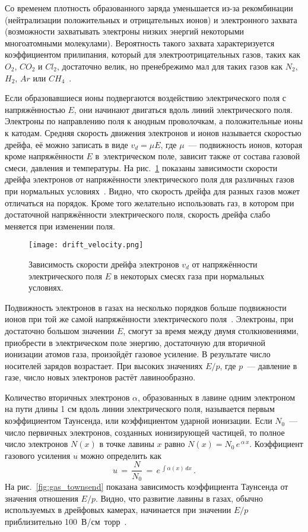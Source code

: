 Со временем плотность образованного заряда уменьшается из-за рекомбинации
(нейтрализации положительных и отрицательных ионов) и электронного захвата
(возможности захватывать электроны низких энергий некоторыми многоатомными
молекулами). Вероятность такого захвата характеризуется коэффициентом
прилипания, который для электроотрицательных газов, таких как $O_2$, $CO_2$ и
$Cl_2$, достаточно велик, но пренебрежимо мал для таких газов как $N_2$, $H_2$,
$Ar$ или $CH_4$~\cite{klajk90}.

Если образовавшиеся ионы подвергаются воздействию электрического поля с
напряжённостью $E$, они начинают двигаться вдоль линий электрического
поля. Электроны по направлению поля к анодным проволочкам, а положительные ионы
к катодам. Средняя скорость движения электронов и ионов называется скоростью
дрейфа, её можно записать в виде $v_d = \mu E$, где $\mu$~--- подвижность
ионов, которая кроме напряжённости $E$ в~электрическом поле, зависит также от
состава газовой смеси, давления и температуры. На рис.~\ref{fig:drift_velocity}
показаны зависимости скорости дрейфа электронов от напряжённости электрического
поля для различных газов при нормальных условиях~\cite{sauli02}. Видно, что
скорость дрейфа для разных газов может отличаться на порядок. Кроме того
желательно использовать газ, в котором при достаточной напряжённости
электрического поля, скорость дрейфа слабо меняется при изменении поля.

\vspace{-0.5cm}
\begin{figure}[h]
  \centering
  \texttt{[image: drift\_velocity.png]}
  \caption{Зависимость скорости дрейфа электронов $v_d$ от напряжённости
    электрического поля $E$ в некоторых смесях газа при нормальных условиях.}
  \label{fig:drift_velocity}
\end{figure}

Подвижность электронов в газах на несколько порядков больше подвижности ионов
при той же самой напряжённости электрического поля~\cite{pesehonov86}.
Электроны, при достаточно большом значении $E$, смогут за время между двумя
столкновениями, приобрести в электрическом поле энергию, достаточную для
вторичной ионизации атомов газа, произойдёт газовое усиление. В результате число
носителей зарядов возрастает. При высоких значениях $E/p$, где $p$~--- давление
в газе, число новых электронов растёт лавинообразно.

Количество вторичных электронов $\alpha$, образованных в лавине одним электроном
на пути длины 1 см вдоль линии электрического поля, называется первым
коэффициентом Таунсенда, или коэффициентом ударной ионизации. Если $N_0$~---
число первичных электронов, созданных ионизирующей частицей, то полное число
электронов $N(x)$ в точке лавины $x$ равно $N(x) = N_0\,e^{\,\alpha\,x}$.
Коэффициент газового усиления $u$ можно определить как
\begin{equation}
  u\,=\,\frac{N}{N_0}\,=\,e^{\,\int \alpha(x)\,dx}\,.
\end{equation}
На рис.~\ref{fig:gas_townsend} показана зависимость коэффициента Таунсенда от
значения отношения $E/p$. Видно, что развитие лавины в газах, обычно
используемых в дрейфовых камерах, начинается при значении $E/p$ приблизительно
100~В/см~торр~\cite{rope04}.

